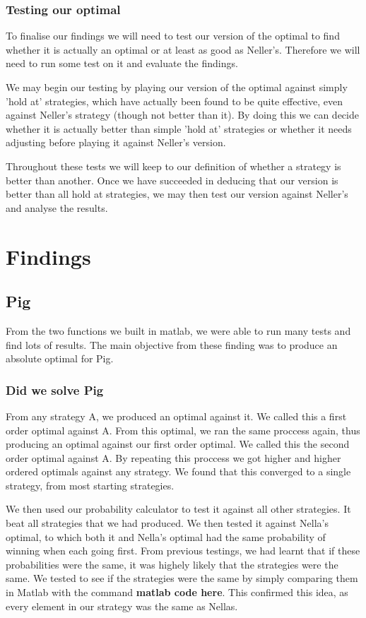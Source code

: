 \documentclass[a4paper,titlepage]{article}
\begin{document}
\subsubsection{Testing our optimal}
To finalise our findings we will need to test our version of the optimal to find whether it is actually an optimal or at least as good as Neller’s\citep{neller2004optimal}. Therefore we will need to run some test on it and evaluate the findings.

We may begin our testing by playing our version of the optimal against simply 'hold at' strategies, which have actually been found to be quite effective, even against Neller’s strategy (though not better than it). By doing this we can decide whether it is actually better than simple 'hold at' strategies or whether it needs adjusting before playing it against Neller’s version.

Throughout these tests we will keep to our definition of whether a strategy is better than another. Once we have succeeded in deducing that our version is better than all hold at strategies, we may then test our version against Neller’s and analyse the results.

\section{Findings}

\subsection{Pig}

From the two functions we built in matlab, we were able to run many tests and find lots of results. The main objective from these finding was to produce an absolute optimal for Pig.

\subsubsection{Did we solve Pig}

From any strategy A, we produced an optimal against it. We called this a first order optimal against A. From this optimal, we ran the same proccess again, thus producing an optimal against our first order optimal. We called this the second order optimal against A. By repeating this proccess we got higher and higher ordered optimals against any strategy. We found that this converged to a single strategy, from most starting strategies.

We then used our probability calculator to test it against all other strategies. It beat all strategies that we had produced. We then tested it against Nella's optimal, to which both it and Nella's optimal had the same probability of winning when each going first. From previous testings, we had learnt that if these probabilities were the same, it was highely likely that the strategies were the same. We tested to see if the strategies were the same by simply comparing them in Matlab with the command \textbf{matlab code here}. This confirmed this idea, as every element in our strategy was the same as Nellas.
\end{document}
